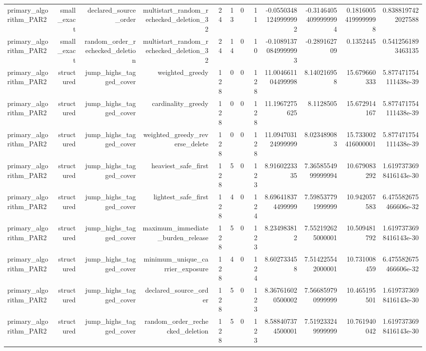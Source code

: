 {\begin{longtable}{lrrrrrrrrrrr}
primary\_algorithm\_PAR2 & small\_exact & declared\_source\_order & multistart\_random\_rechecked\_deletion\_32 & 24 & 13 & 0 & 11 & -0.05503481249999992 & -0.31464054099999994 & 0.18160054199999998 & 0.8388197422027588 \\
primary\_algorithm\_PAR2 & small\_exact & random\_order\_rechecked\_deletion & multistart\_random\_rechecked\_deletion\_32 & 24 & 14 & 0 & 10 & -0.10891370849999993 & -0.289162709 & 0.1352445 & 0.5412561893463135 \\
primary\_algorithm\_PAR2 & structured & jump\_highs\_tagged\_cover & weighted\_greedy & 128 & 0 & 0 & 128 & 11.004661104499998 & 8.140216958 & 15.679660333 & 5.877471754111438e-39 \\
primary\_algorithm\_PAR2 & structured & jump\_highs\_tagged\_cover & cardinality\_greedy & 128 & 0 & 0 & 128 & 11.1967275625 & 8.1128505 & 15.672914167 & 5.877471754111438e-39 \\
primary\_algorithm\_PAR2 & structured & jump\_highs\_tagged\_cover & weighted\_greedy\_reverse\_delete & 128 & 0 & 0 & 128 & 11.094703124999999 & 8.023489083 & 15.733002416000001 & 5.877471754111438e-39 \\
primary\_algorithm\_PAR2 & structured & jump\_highs\_tagged\_cover & heaviest\_safe\_first & 128 & 5 & 0 & 123 & 8.9160223335 & 7.3658554999999994 & 10.679083292 & 1.6197373698416143e-30 \\
primary\_algorithm\_PAR2 & structured & jump\_highs\_tagged\_cover & lightest\_safe\_first & 128 & 4 & 0 & 124 & 8.696418374499999 & 7.598537791999999 & 10.942057583 & 6.475582675466606e-32 \\
primary\_algorithm\_PAR2 & structured & jump\_highs\_tagged\_cover & maximum\_immediate\_burden\_release & 128 & 5 & 0 & 123 & 8.234983812 & 7.552192625000001 & 10.509481792 & 1.6197373698416143e-30 \\
primary\_algorithm\_PAR2 & structured & jump\_highs\_tagged\_cover & minimum\_unique\_carrier\_exposure & 128 & 4 & 0 & 124 & 8.602733458 & 7.514225542000001 & 10.731008459 & 6.475582675466606e-32 \\
primary\_algorithm\_PAR2 & structured & jump\_highs\_tagged\_cover & declared\_source\_order & 128 & 5 & 0 & 123 & 8.367616020500002 & 7.566859790999999 & 10.465195501 & 1.6197373698416143e-30 \\
primary\_algorithm\_PAR2 & structured & jump\_highs\_tagged\_cover & random\_order\_rechecked\_deletion & 128 & 5 & 0 & 123 & 8.588407374500001 & 7.519233249999999 & 10.761940042 & 1.6197373698416143e-30 \\

\end{longtable}}
